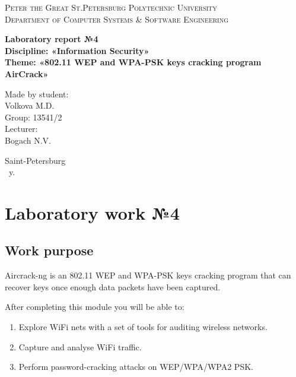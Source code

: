 \documentclass[14pt,a4paper,report]{report}
\begin{document}
\def\contentsname{Contents}

\begin{titlepage}
	\begin{center}
		\textsc{Peter the Great St.Petersburg Polytechnic University\\[5mm]
			Department of Computer Systems \& Software Engineering}
		
		\vfill
		
		\textbf{Laboratory report №4\\[3mm]
			Discipline: «Information Security»\\[3mm]
			Theme: «802.11 WEP and WPA-PSK keys cracking program AirCrack»\\[41mm]
		}
	\end{center}
	
	\hfill
	\begin{minipage}{.4\textwidth}
		Made by student:\\[2mm] 
		Volkova M.D.\\
		Group: 13541/2\\[5mm]
		
		Lecturer:\\[2mm] 
		Bogach N.V.
	\end{minipage}
	\vfill
	\begin{center}
		Saint-Petersburg\\ \the\year\ y.
	\end{center}
\end{titlepage}

\tableofcontents
\clearpage

\chapter{Laboratory work №4}

\section{Work purpose}

Aircrack-ng is an 802.11 WEP and WPA-PSK keys cracking program that can recover keys once enough data packets have been captured.

After completing this module you will be able to:

\begin{enumerate}
	\item Explore WiFi nets with a set of tools for auditing wireless networks.
	\item Capture and analyse WiFi traffic.
	\item Perform password-cracking attacks on WEP/WPA/WPA2 PSK.
\end{enumerate}
\end{document}
